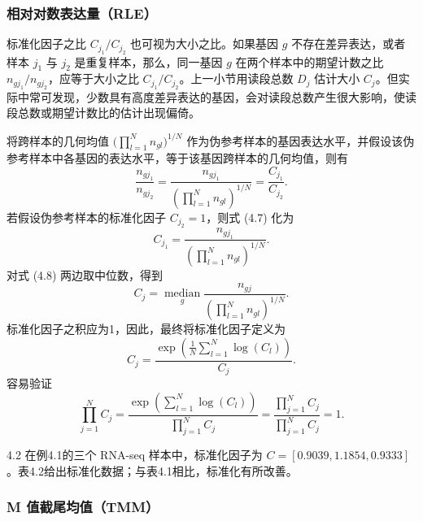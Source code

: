 \subsubsection{相对对数表达量（RLE）}

标准化因子之比 $C_{j_1}/C_{j_2}$ 也可视为大小之比。如果基因 $g$ 不存在差异表达，或者样本 $j_1$ 与 $j_2$ 是重复样本，那么，同一基因 $g$ 在两个样本中的期望计数之比 $n_{gj_1}/n_{gj_2}$，应等于大小之比 $C_{j_1}/C_{j_2}$。上一小节用读段总数 $D_j$ 估计大小 $C_j$。但实际中常可发现，少数具有高度差异表达的基因，会对读段总数产生很大影响，使读段总数或期望计数比的估计出现偏倚。

将跨样本的几何均值 $\bigl(\prod_{l=1}^{N}n_{gl}\bigr)^{1/N}$ 作为伪参考样本的基因表达水平，并假设该伪参考样本中各基因的表达水平，等于该基因跨样本的几何均值，则有
\begin{equation}
\frac{n_{gj_1}}{n_{gj_2}}
=\frac{n_{gj_1}}{\left(\prod_{l=1}^{N}n_{gl}\right)^{1/N}}
=\frac{C_{j_1}}{C_{j_2}}.
\tag{4.7}
\end{equation}
若假设伪参考样本的标准化因子 $C_{j_2}=1$，则式 (4.7) 化为
\begin{equation}
C_{j_1}=\frac{n_{gj_1}}{\left(\prod_{l=1}^{N}n_{gl}\right)^{1/N}}.
\tag{4.8}
\end{equation}
对式 (4.8) 两边取中位数，得到
\begin{equation}
C_j=\underset{g}{\operatorname{median}}\frac{n_{gj}}{\left(\prod_{l=1}^{N}n_{gl}\right)^{1/N}}.
\tag{4.9}
\end{equation}
标准化因子之积应为1，因此，最终将标准化因子定义为
\begin{equation}
C_j=\frac{\exp\left(\frac1N\sum_{l=1}^{N}\log(C_l)\right)}{C_j}.
\tag{4.10}
\end{equation}
容易验证
\[
\prod_{j=1}^{N}C_j
=\frac{\exp\left(\sum_{l=1}^{N}\log(C_l)\right)}{\prod_{j=1}^{N}C_j}
=\frac{\prod_{j=1}^{N}C_j}{\prod_{j=1}^{N}C_j}=1.
\]

\begin{bookexample}{4.2}
在例4.1的三个 RNA-seq 样本中，标准化因子为 $C=[0.9039,1.1854,0.9333]$。表4.2给出标准化数据；与表4.1相比，标准化有所改善。
\end{bookexample}


\subsubsection{M 值截尾均值（TMM）}

